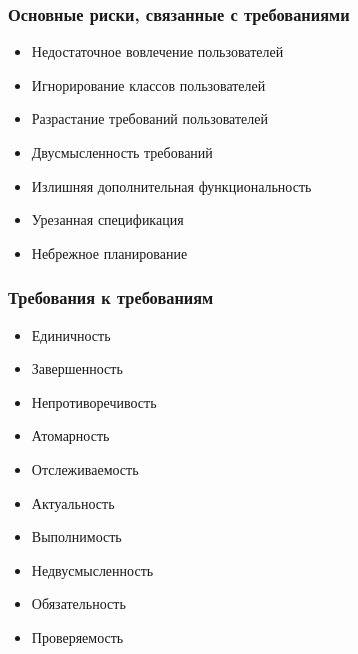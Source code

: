 \documentclass{../../slides-style}
\begin{document}
    \begin{frame}
        \frametitle{Основные риски, связанные с требованиями}
        \begin{itemize}
            \item Недостаточное вовлечение пользователей
            \item Игнорирование классов пользователей
            \item Разрастание требований пользователей
            \item Двусмысленность требований
            \item Излишняя дополнительная функциональность
            \item Урезанная спецификация
            \item Небрежное планирование
        \end{itemize}
    \end{frame}

    \begin{frame}
        \frametitle{Требования к требованиям}
        \begin{itemize}
            \item Единичность
            \item Завершенность
            \item Непротиворечивость
            \item Атомарность
            \item Отслеживаемость
            \item Актуальность
            \item Выполнимость
            \item Недвусмысленность
            \item Обязательность
            \item Проверяемость
        \end{itemize}
    \end{frame}
\end{document}
